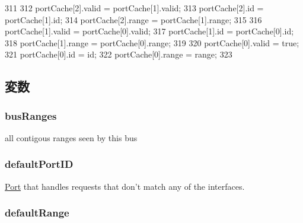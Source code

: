 \begin{DoxyCode}
311                                                                   {
312         portCache[2].valid = portCache[1].valid;
313         portCache[2].id    = portCache[1].id;
314         portCache[2].range = portCache[1].range;
315 
316         portCache[1].valid = portCache[0].valid;
317         portCache[1].id    = portCache[0].id;
318         portCache[1].range = portCache[0].range;
319 
320         portCache[0].valid = true;
321         portCache[0].id    = id;
322         portCache[0].range = range;
323     }
\end{DoxyCode}


\subsection{変数}
\hypertarget{classBaseBus_ae980bda7663fbe15e79dd75a91d8448c}{
\subsubsection[{busRanges}]{ {\bf busRanges}}}
\label{classBaseBus_ae980bda7663fbe15e79dd75a91d8448c}
all contigous ranges seen by this bus \hypertarget{classBaseBus_a769e7b27ddafebcc1228757f2c9ec1ba}{
\subsubsection[{defaultPortID}]{ {\bf defaultPortID}}}
\label{classBaseBus_a769e7b27ddafebcc1228757f2c9ec1ba}
\hyperlink{classPort}{Port} that handles requests that don't match any of the interfaces. \hypertarget{classBaseBus_aacb632304c6d3351600303116de8870d}{
\subsubsection[{defaultRange}]{ {\bf defaultRange}}}
